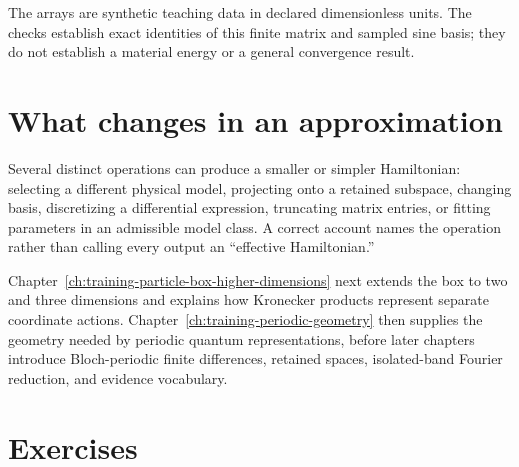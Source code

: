 The arrays are synthetic teaching data in declared dimensionless units. The
checks establish exact identities of this finite matrix and sampled sine basis;
they do not establish a material energy or a general convergence result.


\section{What changes in an approximation}

Several distinct operations can produce a smaller or simpler Hamiltonian:
selecting a different physical model, projecting onto a retained subspace,
changing basis, discretizing a differential expression, truncating matrix
entries, or fitting parameters in an admissible model class. A correct account
names the operation rather than calling every output an ``effective
Hamiltonian.''

Chapter~\ref{ch:training-particle-box-higher-dimensions} next extends the box
to two and three dimensions and explains how Kronecker products represent
separate coordinate actions. Chapter~\ref{ch:training-periodic-geometry} then
supplies the geometry needed by periodic quantum representations, before later
chapters introduce Bloch-periodic finite differences, retained spaces,
isolated-band Fourier reduction, and evidence vocabulary.

\section{Exercises}


